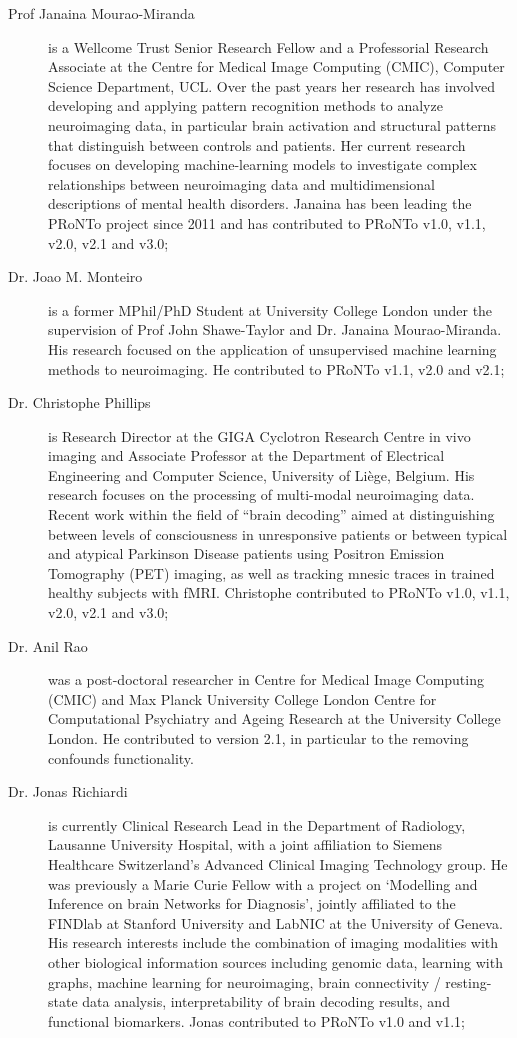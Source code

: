 \begin{description}
	\item[Prof Janaina Mourao-Miranda] is a Wellcome Trust Senior Research Fellow and a Professorial Research Associate at the Centre for Medical Image Computing (CMIC), Computer Science Department, UCL. Over the past years her research has involved developing and applying pattern recognition methods to analyze neuroimaging data, in particular brain activation and structural patterns that distinguish between controls and patients. Her current research focuses on developing machine-learning models to investigate complex relationships between neuroimaging data and multidimensional descriptions of mental health disorders. Janaina has been leading the PRoNTo project since 2011 and has contributed to PRoNTo v1.0, v1.1, v2.0, v2.1 and v3.0;
	\item[Dr. Joao M. Monteiro] is a former MPhil/PhD Student at University College London under the supervision of Prof John Shawe-Taylor and Dr. Janaina Mourao-Miranda. His research focused on the application of unsupervised machine learning methods to neuroimaging. He contributed to PRoNTo v1.1, v2.0 and v2.1;
	\item[Dr. Christophe Phillips] is Research Director at the GIGA Cyclotron Research Centre in vivo imaging and Associate Professor at the Department of Electrical Engineering and Computer Science, University of Li\`ege, Belgium. His research focuses on the processing of multi-modal neuroimaging data. Recent work within the field of ``brain decoding'' aimed at distinguishing between levels of consciousness in unresponsive patients or between typical and atypical Parkinson Disease patients using Positron Emission Tomography (PET) imaging, as well as tracking mnesic traces in trained healthy subjects with fMRI. Christophe contributed to PRoNTo v1.0, v1.1, v2.0, v2.1 and v3.0;
	\item[Dr. Anil Rao] was a post-doctoral researcher in Centre for Medical Image Computing (CMIC) and Max Planck University College London Centre for Computational Psychiatry and Ageing Research at the University College London. He contributed to version 2.1, in particular to the removing confounds functionality.    
	\item[Dr. Jonas Richiardi] is currently Clinical Research Lead in the Department of Radiology, Lausanne University Hospital, with a joint affiliation to Siemens Healthcare Switzerland's Advanced Clinical Imaging Technology group. He was previously a Marie Curie Fellow with a project on `Modelling and Inference on brain Networks for Diagnosis', jointly affiliated to the FINDlab at Stanford University and LabNIC at the University of Geneva. His research interests include the combination of imaging modalities with other biological information sources including genomic data, learning with graphs, machine learning for neuroimaging, brain connectivity / resting-state data analysis, interpretability of brain decoding results, and functional biomarkers. Jonas contributed to PRoNTo v1.0 and v1.1;

\end{description}
